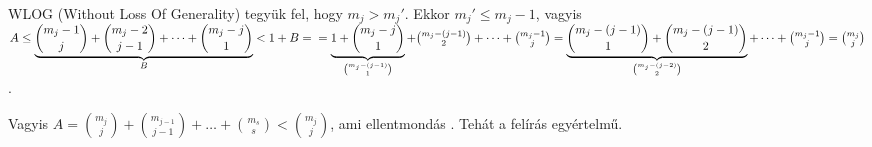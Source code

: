 \bigskip

WLOG (Without Loss Of Generality) tegyük fel, hogy $m_j > m_j'$. Ekkor $m_j' \leq m_j-1$, vagyis $A \leq \underbrace{\binom{m_j-1}{j} + \binom{m_j-2}{j-1} + \dots + \binom{m_j-j}{1}}_{B} < 1+B = \\ = \underbrace{1 + \binom{m_j-j}{1}}_{\binom{m_j-(j-1)}{1}} + \binom{m_j-(j-1)}{2} + \dots + \binom{m_j-1}{j} = \underbrace{\binom{m_j-(j-1)}{1} + \binom{m_j-(j-1)}{2}}_{\binom{m_j-(j-2)}{2}} + \dots + \binom{m_j-1}{j} = \binom{m_j}{j}$.

\bigskip

Vagyis $A = \binom{m_j}{j} + \binom{m_{j-1}}{j-1} + \dots + \binom{m_s}{s} < \binom{m_j}{j}$, ami ellentmondás \Lightning. Tehát a felírás egyértelmű.

\QED
